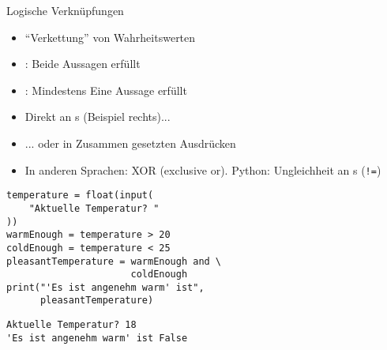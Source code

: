\begin{frame}[fragile]
%
\begin{minipage}[t]{.49\linewidth}
\begin{Large}
Logische Verknüpfungen
\vspace{6pt}
\end{Large}
\begin{itemize}
\item \enquote{Verkettung} von Wahrheitswerten
\item {}: Beide Aussagen erfüllt
\item {}: Mindestens Eine Aussage erfüllt
\item Direkt an s (Beispiel rechts)...
\item ... oder in Zusammen gesetzten Ausdrücken\\
\item In anderen Sprachen: XOR (exclusive or). Python: Ungleichheit an s (\texttt{!=})
\end{itemize}
\end{minipage}
%
\begin{minipage}[t]{.49\linewidth}
\phantom{x}
\begin{codebox}
\begin{verbatim}
temperature = float(input(
    "Aktuelle Temperatur? "
))
warmEnough = temperature > 20
coldEnough = temperature < 25
pleasantTemperature = warmEnough and \
                      coldEnough
print("'Es ist angenehm warm' ist",
      pleasantTemperature)
\end{verbatim}
\end{codebox}
\begin{cmdbox}
\begin{verbatim}
Aktuelle Temperatur? 18
'Es ist angenehm warm' ist False
\end{verbatim}
\end{cmdbox}
\end{minipage}
%
\end{frame}


